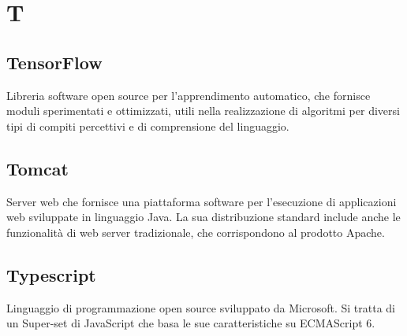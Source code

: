 \section*{T}
\markright{}
\subsection*{TensorFlow}
Libreria software open source per l'apprendimento automatico, che fornisce moduli sperimentati e ottimizzati, utili nella realizzazione di algoritmi per diversi tipi di compiti percettivi e di comprensione del linguaggio.
\subsection*{Tomcat}
Server web che fornisce una piattaforma software per l'esecuzione di applicazioni web sviluppate in linguaggio Java. La sua distribuzione standard include anche le funzionalità di web server tradizionale, che corrispondono al prodotto Apache. 
\subsection*{Typescript}
Linguaggio di programmazione open source sviluppato da Microsoft. Si tratta di un Super-set di JavaScript che basa le sue caratteristiche su ECMAScript 6.